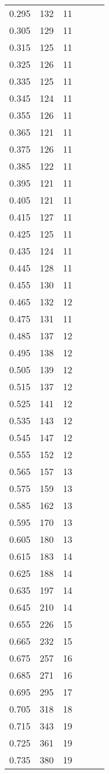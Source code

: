 \begin{center}
\begin{longtable}{c|c|c||c|c|c}
0.295 & 132 & 11\\
0.305 & 129 & 11\\
0.315 & 125 & 11\\
0.325 & 126 & 11\\
0.335 & 125 & 11\\
0.345 & 124 & 11\\
0.355 & 126 & 11\\
0.365 & 121 & 11\\
0.375 & 126 & 11\\
0.385 & 122 & 11\\
0.395 & 121 & 11\\
0.405 & 121 & 11\\
0.415 & 127 & 11\\
0.425 & 125 & 11\\
0.435 & 124 & 11\\
0.445 & 128 & 11\\
0.455 & 130 & 11\\
0.465 & 132 & 12\\
0.475 & 131 & 11\\
0.485 & 137 & 12\\
0.495 & 138 & 12\\
0.505 & 139 & 12\\
0.515 & 137 & 12\\
0.525 & 141 & 12\\
0.535 & 143 & 12\\
0.545 & 147 & 12\\
0.555 & 152 & 12\\
0.565 & 157 & 13\\
0.575 & 159 & 13\\
0.585 & 162 & 13\\
0.595 & 170 & 13\\
0.605 & 180 & 13\\
0.615 & 183 & 14\\
0.625 & 188 & 14\\
0.635 & 197 & 14\\
0.645 & 210 & 14\\
0.655 & 226 & 15\\
0.665 & 232 & 15\\
0.675 & 257 & 16\\
0.685 & 271 & 16\\
0.695 & 295 & 17\\
0.705 & 318 & 18\\
0.715 & 343 & 19\\
0.725 & 361 & 19\\
0.735 & 380 & 19\\

\end{longtable}
\end{center}
